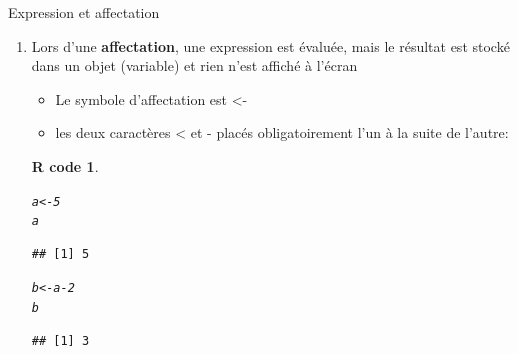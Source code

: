 \documentclass[11pt]{beamer}\usepackage[]{graphicx}\usepackage[]{color}
\makeatletter
\newcommand{\hlnum}[1]{\textcolor[rgb]{0.063,0.58,0.627}{#1}}%
\newcommand{\hlopt}[1]{\textcolor[rgb]{0.196,0.196,0.196}{#1}}%
\newcommand{\hlstd}[1]{\textcolor[rgb]{0.196,0.196,0.196}{#1}}%
\newcommand{\hlkwb}[1]{\textcolor[rgb]{0.627,0,0.314}{#1}}%
\newenvironment{kframe}{%
 \def\at@end@of@kframe{}%
 \ifinner\ifhmode%
  \def\at@end@of@kframe{\end{minipage}}%
  \begin{minipage}{\columnwidth}%
 \fi\fi%
 \def\FrameCommand##1{\hskip\@totalleftmargin \hskip-\fboxsep
 \colorbox{shadecolor}{##1}\hskip-\fboxsep
     \hskip-\linewidth \hskip-\@totalleftmargin \hskip\columnwidth}%
 \MakeFramed {\advance\hsize-\width
   \@totalleftmargin\z@ \linewidth\hsize
   \@setminipage}}%
 {\par\unskip\endMakeFramed%
 \at@end@of@kframe}
\newenvironment{knitrout}{}{} %
\newtheorem{rcode}{R code}[section]
\newcounter{saveenumi}
\newcommand{\seti}{\setcounter{saveenumi}{\value{enumi}}}
\newcommand{\conti}{\setcounter{enumi}{\value{saveenumi}}}
\makeatother
\begin{document}
\begin{frame}[fragile]{Expression et affectation} 
\begin{enumerate}
\conti
\item Lors d’une \textbf{affectation}, une expression est évaluée, mais le résultat est stocké dans un objet (variable) et rien n’est affiché à l’écran
\begin{itemize}
\item Le symbole d’affectation est <-  
\item les deux caractères < et - placés obligatoirement l'un à la suite de l'autre:
\end{itemize}
\pause
\begin{knitrout}
\color{fgcolor}\begin{kframe}
\begin{rcode}\label{unnamed-chunk-23}\begin{alltt}
\hlstd{a} \hlkwb{<-} \hlnum{5}
\hlstd{a}
\end{alltt}
\begin{verbatim}
## [1] 5
\end{verbatim}
\begin{alltt}
\hlstd{b} \hlkwb{<-} \hlstd{a} \hlopt{-} \hlnum{2}
\hlstd{b}
\end{alltt}
\begin{verbatim}
## [1] 3
\end{verbatim}
\end{rcode}\end{kframe}
\end{knitrout}
\seti
\end{enumerate}

\end{frame}
\end{document}
